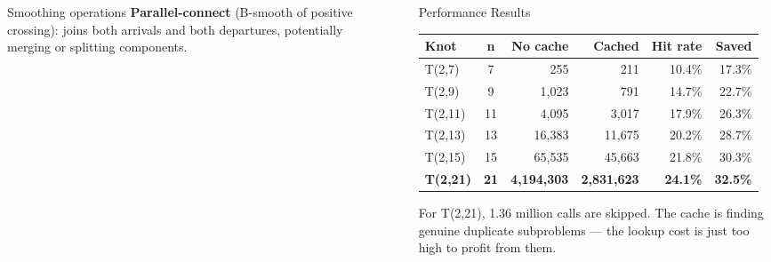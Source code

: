 \documentclass[final]{beamer}
\newlength{\sepwidth}
\newlength{\colwidth}
\newcommand{\separatorcolumn}{\begin{column}{\sepwidth}\end{column}}
\begin{document}
\begin{frame}[t,fragile]
\begin{columns}[t]
\begin{column}{\colwidth}
\begin{block}{Smoothing operations}
    \textbf{Parallel-connect} (B-smooth of positive crossing): joins both arrivals and both departures, potentially merging or splitting components.
  \end{block}

\end{column}

\separatorcolumn

\begin{column}{\colwidth}

  \begin{block}{Performance Results}

    \begin{center}
    \begin{tabular}{lcrrrr}
    \toprule
    \textbf{Knot} & \textbf{n} & \textbf{No cache} & \textbf{Cached} & \textbf{Hit rate} & \textbf{Saved} \\
    \midrule
    T(2,7)  &  7 &       255 &       211 & 10.4\% & 17.3\% \\
    T(2,9)  &  9 &     1,023 &       791 & 14.7\% & 22.7\% \\
    T(2,11) & 11 &     4,095 &     3,017 & 17.9\% & 26.3\% \\
    T(2,13) & 13 &    16,383 &    11,675 & 20.2\% & 28.7\% \\
    T(2,15) & 15 &    65,535 &    45,663 & 21.8\% & 30.3\% \\
    \textbf{T(2,21)} & \textbf{21} & \textbf{4,194,303} & \textbf{2,831,623} & \textbf{24.1\%} & \textbf{32.5\%} \\
    \bottomrule
    \end{tabular}
    \end{center}

    \vspace{0.1cm}
    For T(2,21), 1.36 million calls are skipped. The cache is finding genuine duplicate subproblems --- the lookup cost is just too high to profit from them.

    \vspace{0.15cm}


\end{block}
\end{column}
\end{columns}
\end{frame}
\end{document}
